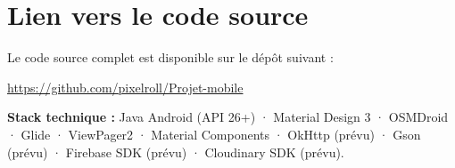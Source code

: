 \documentclass[a4paper,11pt]{article}
\begin{document}
\section{Lien vers le code source}

Le code source complet est disponible sur le dépôt suivant :

\medskip
\begin{center}
    \large\url{https://github.com/pixelroll/Projet-mobile}
\end{center}

\medskip
\noindent\textbf{Stack technique :} Java Android (API 26+) · Material Design 3 · OSMDroid · Glide · ViewPager2 · Material Components · OkHttp (prévu) · Gson (prévu) · Firebase SDK (prévu) · Cloudinary SDK (prévu).
\end{document}
